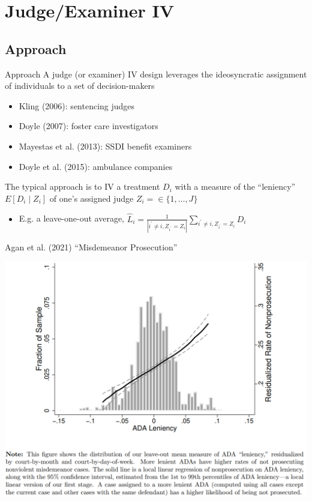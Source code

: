 \documentclass{beamer}
\begin{document}

\section{Judge/Examiner IV}

\subsection{Approach}
\begin{frame}{Approach}
\vspace{-0.2cm}
A judge (or examiner) IV design leverages the ideosyncratic assignment of individuals to a set of decision-makers\smallskip
\begin{itemize}
\item Kling (2006): sentencing judges\smallskip
\item Doyle (2007): foster care investigators\smallskip
\item Mayestas et al. (2013): SSDI benefit examiners\smallskip
\item Doyle et al. (2015): ambulance companies
\end{itemize}\bigskip\pause{}
The typical approach is to IV a treatment $D_i$ with a measure of the ``leniency'' $E[D_i\mid Z_{i}]$ of one's assigned judge $Z_i=\in\{1,\dots,J\}$\smallskip
\begin{itemize}
\item E.g. a leave-one-out average, $\hat{L}_i=\frac{1}{|i^\prime\neq i,Z_{i^\prime}=Z_i|}\sum_{i^\prime \neq i,Z_{i^\prime}=Z_i}D_i$
\end{itemize}
\end{frame}

\begin{frame}{Agan et al. (2021) ``Misdemeanor Prosecution''}
\begin{center}
\includegraphics[scale=0.55]{./lecture_includes/agan_FS.png}
\end{center}
\end{frame}
\end{document}
